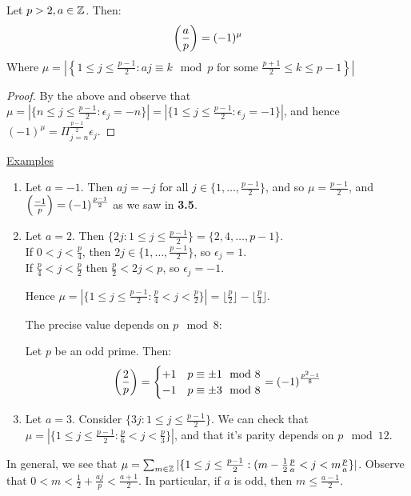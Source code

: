 \documentclass[10pt,a4paper]{article}
\begin{document}
\begin{lemma}
Let $p>2, a\in \mathbb{Z}$. Then:
\begin{align*}
\left(\frac{a}{p}\right) = (-1)^\mu
\end{align*}
Where $\mu = \left|\left\{ 1\leq j\leq \frac{p-1}{2} : aj\equiv k \mod p \text{ for some } \frac{p+1}{2} \leq k \leq p-1\right\}\right|$
\end{lemma}
\begin{proof}
By the above and observe that $\mu = |\{n \leq j\leq \frac{p-1}{2} : \epsilon_j = -n \}| = |\{1\leq j \leq \frac{p-1}{2} : \epsilon_j = -1\}|$, and hence $(-1)^\mu = \Pi_{j=n}^{\frac{p-1}{2}} \epsilon_j$.
\end{proof}
\underline{Examples}
\begin{enumerate}
\item Let $a=-1$. Then $aj=-j$ for all $j \in \{1, \ldots, \frac{p-1}{2}\}$, and so $\mu = \frac{p-1}{2}$, and $\left(\frac{-1}{p}\right) = (-1)^{\frac{p-1}{2}}$ as we saw in \textbf{3.5}.

\item Let $a=2$. Then $\{2j: 1 \leq j \leq \frac{p-1}{2}\} = \{2,4,\ldots, p-1\}$.\\
If $0<j<\frac{p}{4}$, then $2j \in \{1,\ldots, \frac{p-1}{2}\}$, so $\epsilon_j = 1$.\\
If $\frac{p}{4} < j <\frac{p}{2}$ then $\frac{p}{2} < 2j < p$, so $\epsilon_j = -1$.

Hence $\mu = |\{1\leq j\leq \frac{p-1}{2} : \frac{p}{4} < j < \frac{p}{2}\}| = \lfloor\frac{p}{2}\rfloor - \lfloor \frac{p}{4}\rfloor$.

The precise value depends on $p\mod 8$:
\begin{corollary}
Let $p$ be an odd prime. Then:
\begin{align*}
\left(\frac{2}{p}\right) = \begin{cases} +1 & p\equiv \pm 1\mod 8 \\ -1 & p \equiv \pm 3 \mod 8 \end{cases}  = (-1)^{\frac{p^2-1}{8}}
\end{align*}
\end{corollary}

\item Let $a=3$. Consider $\{3j: 1\leq j\leq \frac{p-1}{2}\}$. We can check that $\mu = |\{1\leq j\leq \frac{p-1}{2} : \frac{p}{6} < j < \frac{p}{3}\}|$, and that it's parity depends on $p \mod 12$.
\end{enumerate}
In general, we see that $\mu = \sum_{m\in \mathbb{Z}} |\{1\leq j\leq \frac{p-1}{2} : (m-\frac{1}{2} \frac{p}{a} < j < m\frac{p}{a}\}|$. Observe that $0<m < \frac{1}{2} + \frac{aj}{p} < \frac{a+1}{2}$. In particular, if $a$ is odd, then $m\leq \frac{a-1}{2}$.
\end{document}

